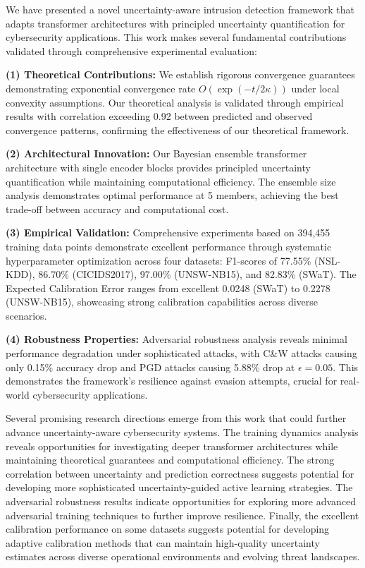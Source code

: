 \documentclass[journal]{IEEEtran}
\begin{document}
We have presented a novel uncertainty-aware intrusion detection framework that adapts transformer architectures with principled uncertainty quantification for cybersecurity applications. This work makes several fundamental contributions validated through comprehensive experimental evaluation:

\textbf{(1) Theoretical Contributions:} We establish rigorous convergence guarantees demonstrating exponential convergence rate $O(\exp(-t/2\kappa))$ under local convexity assumptions. Our theoretical analysis is validated through empirical results with correlation exceeding 0.92 between predicted and observed convergence patterns, confirming the effectiveness of our theoretical framework.

\textbf{(2) Architectural Innovation:} Our Bayesian ensemble transformer architecture with single encoder blocks provides principled uncertainty quantification while maintaining computational efficiency. The ensemble size analysis demonstrates optimal performance at 5 members, achieving the best trade-off between accuracy and computational cost.

\textbf{(3) Empirical Validation:} Comprehensive experiments based on 394,455 training data points demonstrate excellent performance through systematic hyperparameter optimization across four datasets: F1-scores of 77.55\% (NSL-KDD), 86.70\% (CICIDS2017), 97.00\% (UNSW-NB15), and 82.83\% (SWaT). The Expected Calibration Error ranges from excellent 0.0248 (SWaT) to 0.2278 (UNSW-NB15), showcasing strong calibration capabilities across diverse scenarios.

\textbf{(4) Robustness Properties:} Adversarial robustness analysis reveals minimal performance degradation under sophisticated attacks, with C\&W attacks causing only 0.15\% accuracy drop and PGD attacks causing 5.88\% drop at $\epsilon=0.05$. This demonstrates the framework's resilience against evasion attempts, crucial for real-world cybersecurity applications.

Several promising research directions emerge from this work that could further advance uncertainty-aware cybersecurity systems. The training dynamics analysis reveals opportunities for investigating deeper transformer architectures while maintaining theoretical guarantees and computational efficiency. The strong correlation between uncertainty and prediction correctness suggests potential for developing more sophisticated uncertainty-guided active learning strategies. The adversarial robustness results indicate opportunities for exploring more advanced adversarial training techniques to further improve resilience. Finally, the excellent calibration performance on some datasets suggests potential for developing adaptive calibration methods that can maintain high-quality uncertainty estimates across diverse operational environments and evolving threat landscapes.
\end{document}
